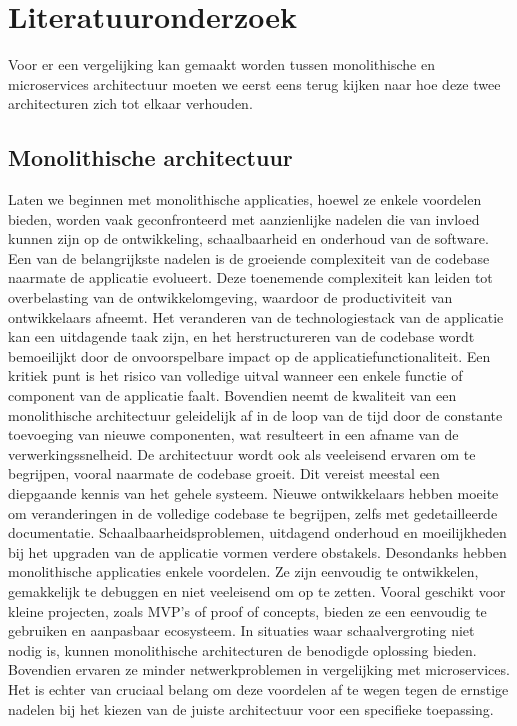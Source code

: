 

\section{Literatuuronderzoek}
\label{sec:literatuuronderzoek}
Voor er een vergelijking kan gemaakt worden tussen monolithische en microservices architectuur moeten we eerst eens terug kijken naar hoe deze twee architecturen zich tot elkaar verhouden.


\subsection*{Monolithische architectuur}
Laten we beginnen met monolithische applicaties, hoewel ze enkele voordelen bieden, worden vaak geconfronteerd met aanzienlijke nadelen die van invloed kunnen zijn op de ontwikkeling, schaalbaarheid en onderhoud van de software. 
Een van de belangrijkste nadelen is de groeiende complexiteit van de codebase naarmate de applicatie evolueert. Deze toenemende complexiteit kan leiden tot overbelasting van de ontwikkelomgeving, waardoor de productiviteit van ontwikkelaars afneemt. Het veranderen van de technologiestack van de applicatie kan een uitdagende taak zijn, en het herstructureren van de codebase wordt bemoeilijkt door de onvoorspelbare impact op de applicatiefunctionaliteit. 
Een kritiek punt is het risico van volledige uitval wanneer een enkele functie of component van de applicatie faalt. Bovendien neemt de kwaliteit van een monolithische architectuur geleidelijk af in de loop van de tijd door de constante toevoeging van nieuwe componenten, wat resulteert in een afname van de verwerkingssnelheid.
De architectuur wordt ook als veeleisend ervaren om te begrijpen, vooral naarmate de codebase groeit. Dit vereist meestal een diepgaande kennis van het gehele systeem. Nieuwe ontwikkelaars hebben moeite om veranderingen in de volledige codebase te begrijpen, zelfs met gedetailleerde documentatie. Schaalbaarheidsproblemen, uitdagend onderhoud en moeilijkheden bij het upgraden van de applicatie vormen verdere obstakels. 
Desondanks hebben monolithische applicaties enkele voordelen. Ze zijn eenvoudig te ontwikkelen, gemakkelijk te debuggen en niet veeleisend om op te zetten. Vooral geschikt voor kleine projecten, zoals MVP's of proof of concepts, bieden ze een eenvoudig te gebruiken en aanpasbaar ecosysteem. In situaties waar schaalvergroting niet nodig is, kunnen monolithische architecturen de benodigde oplossing bieden. Bovendien ervaren ze minder netwerkproblemen in vergelijking met microservices. Het is echter van cruciaal belang om deze voordelen af te wegen tegen de ernstige nadelen bij het kiezen van de juiste architectuur voor een specifieke toepassing.

